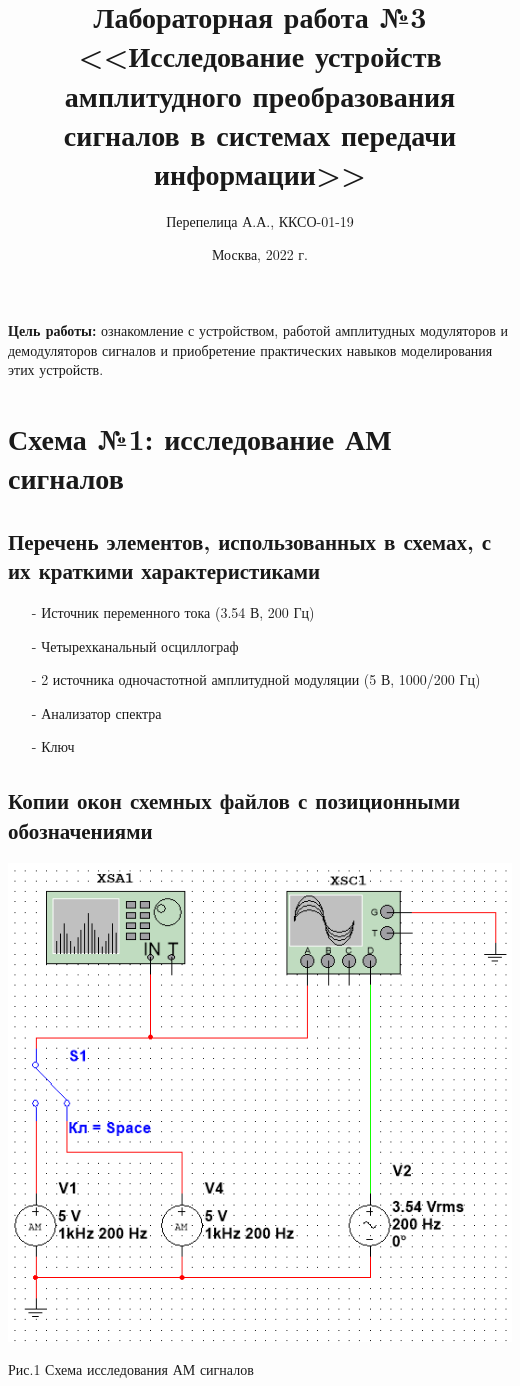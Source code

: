 \documentclass[11pt]{article}
\title{\textbf{Лабораторная работа №3\\<<Исследование устройств амплитудного преобразования сигналов в системах передачи информации>>}}
\author{Перепелица А.А., ККСО-01-19}
\date{Москва, 2022 г.}
\begin{document}
\maketitle
\thispagestyle{empty}
\textbf{Цель работы:} ознакомление с устройством, работой амплитудных 
модуляторов и демодуляторов сигналов и приобретение практических навыков 
моделирования этих устройств.

\section{Схема №1: исследование АМ сигналов}
\subsection{Перечень элементов, использованных в схемах, с
их краткими характеристиками}
\begin{itemize}
    \item[-] Источник переменного тока (3.54 В, 200 Гц)
    \item[-] Четырехканальный осциллограф
    \item[-] 2 источника одночастотной амплитудной модуляции (5 В, 1000/200 Гц)
    \item[-] Анализатор спектра 
    \item[-] Ключ
\end{itemize}


\subsection{Копии окон схемных файлов с позиционными обозначениями}
\includegraphics[width=1\linewidth]{img/first.png}
\begin{center}
    Рис.1 Схема исследования АМ сигналов
\end{center}
\end{document}
